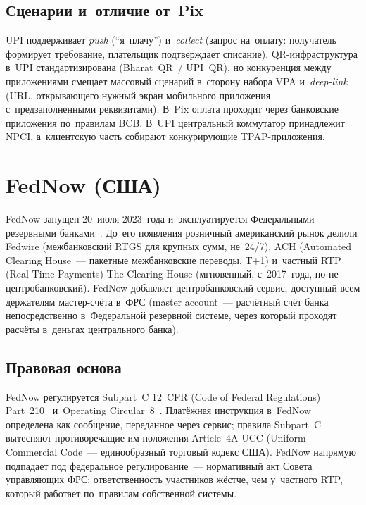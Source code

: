 \subsection*{Сценарии и~отличие от~Pix}\label{subsec:upi-vs-pix}

UPI поддерживает \textit{push} (\enquote{я~плачу}) и~\textit{collect} (запрос
на~оплату: получатель формирует требование, плательщик подтверждает списание).
QR-инфраструктура в~UPI стандартизирована (Bharat~QR~/ UPI~QR), но конкуренция
между приложениями смещает массовый сценарий в~сторону набора VPA
и~\textit{deep-link} (URL, открывающего нужный экран мобильного приложения
с~предзаполненными реквизитами). В~Pix оплата проходит через банковские
приложения по~правилам BCB. В~UPI центральный коммутатор принадлежит NPCI,
а~клиентскую часть собирают конкурирующие TPAP-приложения.

\section{FedNow (США)}\label{sec:fednow-system}

FedNow запущен 20~июля 2023~года и~эксплуатируется Федеральными резервными
банками~\cite{fednow-about,fednow-resources}. До~его появления розничный
американский рынок делили Fedwire (межбанковский RTGS для крупных сумм,
не~24/7), ACH (Automated Clearing House~--- пакетные
межбанковские переводы, T+1) и~частный RTP (Real-Time Payments) The Clearing
House (мгновенный, с~2017~года, но не центробанковский). FedNow добавляет
центробанковский сервис, доступный всем держателям мастер-счёта в~ФРС (master
  account~--- расчётный счёт банка непосредственно в~Федеральной резервной системе,
через который проходят расчёты в~деньгах центрального банка).

\subsection*{Правовая основа}\label{subsec:fednow-legal}

FedNow регулируется Subpart~C 12~CFR (Code of Federal Regulations)
Part~210~\cite{reg-j-subpart-c} и~Operating Circular~8~\cite{fednow-oc8}.
Платёжная инструкция в~FedNow определена как сообщение, переданное через сервис;
правила Subpart~C вытесняют противоречащие им положения Article~4A UCC (Uniform
Commercial Code~--- единообразный торговый кодекс США). FedNow напрямую подпадает
под федеральное регулирование~--- нормативный акт Совета управляющих ФРС;
ответственность участников жёстче, чем у~частного RTP,
который работает по~правилам собственной системы.

